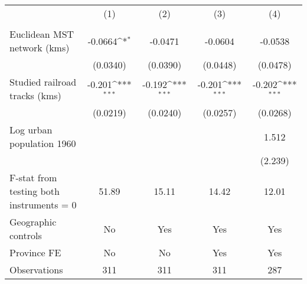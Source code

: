 {
\def\sym#1{\ifmmode^{#1}\else\(^{#1}\)\fi}
\begin{tabular}{l*{4}{c}}
\hline\hline
                &\multicolumn{1}{c}{(1)}&\multicolumn{1}{c}{(2)}&\multicolumn{1}{c}{(3)}&\multicolumn{1}{c}{(4)}\\
                &\multicolumn{1}{c}{}&\multicolumn{1}{c}{}&\multicolumn{1}{c}{}&\multicolumn{1}{c}{}\\
\hline
Euclidean MST network (kms)&  -0.0664\sym{*}  &  -0.0471         &  -0.0604         &  -0.0538         \\
                & (0.0340)         & (0.0390)         & (0.0448)         & (0.0478)         \\
[1em]
Studied railroad tracks (kms)&   -0.201\sym{***}&   -0.192\sym{***}&   -0.201\sym{***}&   -0.202\sym{***}\\
                & (0.0219)         & (0.0240)         & (0.0257)         & (0.0268)         \\
[1em]
Log urban population 1960&                  &                  &                  &    1.512         \\
                &                  &                  &                  &  (2.239)         \\
\hline
F-stat from testing both instruments = 0&    51.89         &    15.11         &    14.42         &    12.01         \\
Geographic controls&       No         &      Yes         &      Yes         &      Yes         \\
Province FE     &       No         &       No         &      Yes         &      Yes         \\
Observations    &      311         &      311         &      311         &      287         \\
\hline\hline
\end{tabular}
}
